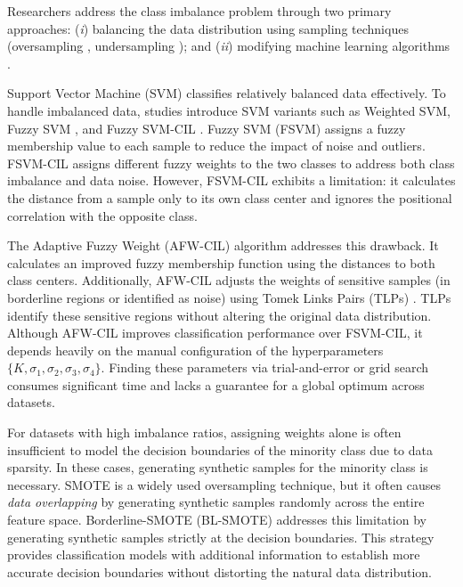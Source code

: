 \documentclass[pdflatex,sn-mathphys-num]{sn-jnl}%
\theoremstyle{thmstyleone}%
\theoremstyle{thmstyletwo}
\theoremstyle{thmstylethree}
\begin{document}
Researchers address the class imbalance problem through two primary approaches: (\textit{i}) balancing the data distribution using sampling techniques (oversampling \cite{chawla2002smote}, undersampling \cite{kubat1997addressing}); and (\textit{ii}) modifying machine learning algorithms \cite{he2009learning, batuwita2010fsvm}.

Support Vector Machine (SVM) \cite{akbani2004applying} classifies relatively balanced data effectively. To handle imbalanced data, studies introduce SVM variants such as Weighted SVM, Fuzzy SVM \cite{lin2002fuzzy, liu2018scalable}, and Fuzzy SVM-CIL \cite{batuwita2010fsvm}. Fuzzy SVM (FSVM) \cite{lin2002fuzzy} assigns a fuzzy membership value to each sample to reduce the impact of noise and outliers. FSVM-CIL \cite{batuwita2010fsvm} assigns different fuzzy weights to the two classes to address both class imbalance and data noise. However, FSVM-CIL exhibits a limitation: it calculates the distance from a sample only to its own class center and ignores the positional correlation with the opposite class.

The Adaptive Fuzzy Weight (AFW-CIL) algorithm \cite{quang2023adaptive} addresses this drawback. It calculates an improved fuzzy membership function using the distances to both class centers. Additionally, AFW-CIL adjusts the weights of sensitive samples (in borderline regions or identified as noise) using Tomek Links Pairs (TLPs) \cite{tomek1976two}. TLPs identify these sensitive regions without altering the original data distribution. Although AFW-CIL improves classification performance over FSVM-CIL, it depends heavily on the manual configuration of the hyperparameters $\{K,\sigma_1, \sigma_2, \sigma_3, \sigma_4\}$. Finding these parameters via trial-and-error or grid search consumes significant time and lacks a guarantee for a global optimum across datasets.

For datasets with high imbalance ratios, assigning weights alone is often insufficient to model the decision boundaries of the minority class due to data sparsity. In these cases, generating synthetic samples for the minority class is necessary. SMOTE \cite{chawla2002smote} is a widely used oversampling technique, but it often causes \textit{data overlapping} by generating synthetic samples randomly across the entire feature space. Borderline-SMOTE (BL-SMOTE) \cite{han2005borderline} addresses this limitation by generating synthetic samples strictly at the decision boundaries. This strategy provides classification models with additional information to establish more accurate decision boundaries without distorting the natural data distribution.
\end{document}
